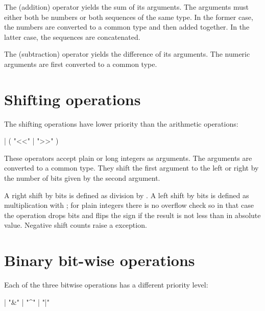 The \code{+} (addition) operator yields the sum of its arguments.
The arguments must either both be numbers or both sequences of the
same type.  In the former case, the numbers are converted to a common
type and then added together.  In the latter case, the sequences are
concatenated.

The \code{-} (subtraction) operator yields the difference of its
arguments.  The numeric arguments are first converted to a common
type.


\section{Shifting operations\label{shifting}}

The shifting operations have lower priority than the arithmetic
operations:

\begin{productionlist}
             {
              |  ( "<<" | ">>" ) }
\end{productionlist}

These operators accept plain or long integers as arguments.  The
arguments are converted to a common type.  They shift the first
argument to the left or right by the number of bits given by the
second argument.

A right shift by  bits is defined as division by
.  A left shift by  bits is defined as
multiplication with ; for plain integers there is
no overflow check so in that case the operation drops bits and flips
the sign if the result is not less than  in absolute
value.  Negative shift counts raise a 
exception.


\section{Binary bit-wise operations\label{bitwise}}

Each of the three bitwise operations has a different priority level:

\begin{productionlist}
             { |  "\&" }
             { |  "\textasciicircum" }
             { |  "|" }
\end{productionlist}


